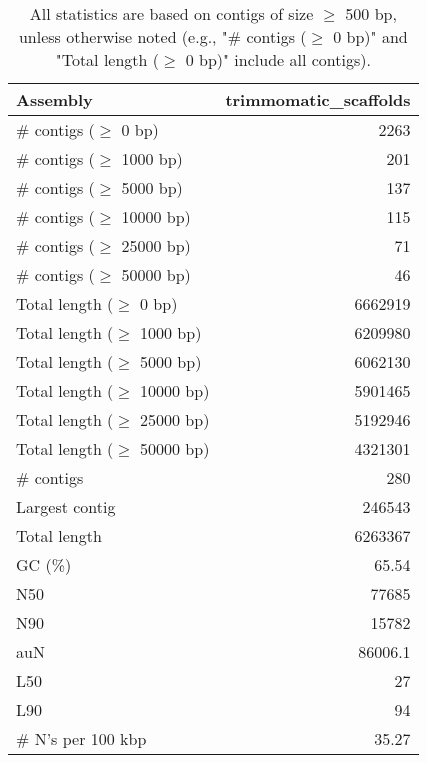 \documentclass[12pt,a4paper]{article}
\begin{document}
\begin{table}[ht]
\begin{center}
\caption{All statistics are based on contigs of size $\geq$ 500 bp, unless otherwise noted (e.g., "\# contigs ($\geq$ 0 bp)" and "Total length ($\geq$ 0 bp)" include all contigs).}
\begin{tabular}{|l*{1}{|r}|}
\hline
Assembly & trimmomatic\_scaffolds \\ \hline
\# contigs ($\geq$ 0 bp) & 2263 \\ \hline
\# contigs ($\geq$ 1000 bp) & 201 \\ \hline
\# contigs ($\geq$ 5000 bp) & 137 \\ \hline
\# contigs ($\geq$ 10000 bp) & 115 \\ \hline
\# contigs ($\geq$ 25000 bp) & 71 \\ \hline
\# contigs ($\geq$ 50000 bp) & 46 \\ \hline
Total length ($\geq$ 0 bp) & 6662919 \\ \hline
Total length ($\geq$ 1000 bp) & 6209980 \\ \hline
Total length ($\geq$ 5000 bp) & 6062130 \\ \hline
Total length ($\geq$ 10000 bp) & 5901465 \\ \hline
Total length ($\geq$ 25000 bp) & 5192946 \\ \hline
Total length ($\geq$ 50000 bp) & 4321301 \\ \hline
\# contigs & 280 \\ \hline
Largest contig & 246543 \\ \hline
Total length & 6263367 \\ \hline
GC (\%) & 65.54 \\ \hline
N50 & 77685 \\ \hline
N90 & 15782 \\ \hline
auN & 86006.1 \\ \hline
L50 & 27 \\ \hline
L90 & 94 \\ \hline
\# N's per 100 kbp & 35.27 \\ \hline
\end{tabular}
\end{center}
\end{table}
\end{document}
